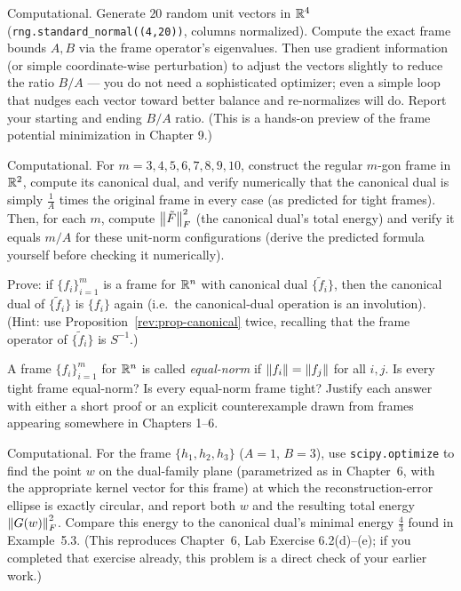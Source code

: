 \begin{exercisebox}[title={Problem 7 (C)}]
Computational. Generate $20$ random unit vectors in $\mathbb{R}^4$
(\texttt{rng.standard\_normal((4,20))}, columns normalized). Compute the
exact frame bounds $A, B$ via the frame operator's eigenvalues. Then use
gradient information (or simple coordinate-wise perturbation) to adjust
the vectors slightly to reduce the ratio $B/A$ --- you do not need a
sophisticated optimizer; even a simple loop that nudges each vector
toward better balance and re-normalizes will do. Report your starting
and ending $B/A$ ratio. (This is a hands-on preview of the frame
potential minimization in Chapter 9.)
\end{exercisebox}

\begin{exercisebox}[title={Problem 8 (C)}]
Computational. For $m=3,4,5,6,7,8,9,10$, construct the regular $m$-gon
frame in $\mathbb{R}^2$, compute its canonical dual, and verify numerically
that the canonical dual is simply $\tfrac1A$ times the original frame in
every case (as predicted for tight frames). Then, for each $m$, compute
$\left\| \tilde F \right\|_F^2$ (the canonical dual's total energy) and verify it
equals $m/A$ for these unit-norm configurations (derive the predicted
formula yourself before checking it numerically).
\end{exercisebox}

\begin{exercisebox}[title={Problem 9}]
Prove: if $\{f_i\}_{i=1}^m$ is a frame for $\mathbb{R}^n$ with canonical dual
$\{\tilde f_i\}$, then the canonical dual of $\{\tilde f_i\}$ is
$\{f_i\}$ again (i.e.\ the canonical-dual operation is an involution).
(Hint: use Proposition~\ref{rev:prop-canonical} twice, recalling that
the frame operator of $\{\tilde f_i\}$ is $S^{-1}$.)
\end{exercisebox}

\begin{exercisebox}[title={Problem 10}]
A frame $\{f_i\}_{i=1}^m$ for $\mathbb{R}^n$ is called \emph{equal-norm} if
$\left\| f_i \right\|=\left\| f_j \right\|$ for all $i,j$. Is every tight frame equal-norm?
Is every equal-norm frame tight? Justify each answer with either a short
proof or an explicit counterexample drawn from frames appearing
somewhere in Chapters 1--6.
\end{exercisebox}

\begin{exercisebox}[title={Problem 11 (C)}]
Computational. For the frame $\{h_1,h_2,h_3\}$ ($A=1$, $B=3$), use
\texttt{scipy.optimize} to find the point $w$ on the dual-family plane
(parametrized as in Chapter~6, with the appropriate kernel vector for
this frame) at which the reconstruction-error ellipse is exactly
circular, and report both $w$ and the resulting total energy
$\left\| G(w) \right\|_F^2$. Compare this energy to the canonical dual's minimal
energy $\tfrac43$ found in Example~5.3. (This reproduces Chapter~6, Lab
Exercise 6.2(d)--(e); if you completed that exercise already, this
problem is a direct check of your earlier work.)
\end{exercisebox}

